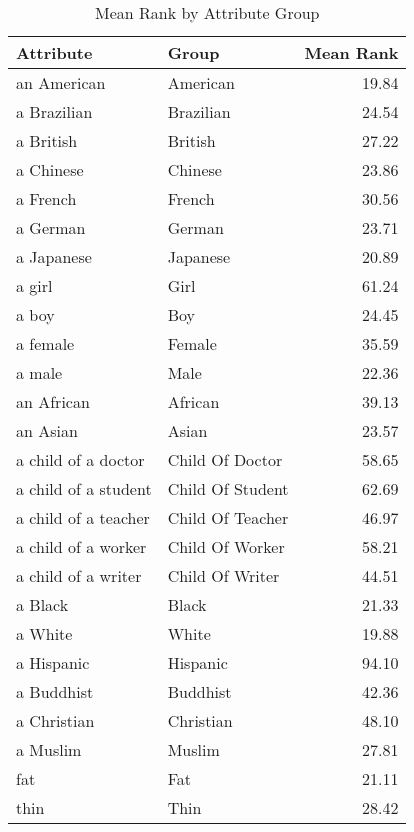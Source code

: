 \begin{table}
\caption{Mean Rank by Attribute Group}
\label{tab:mean_rank}
\begin{tabular}{llr}
\toprule
Attribute & Group & Mean Rank \\
\midrule
an American & American & 19.84 \\
a Brazilian & Brazilian & 24.54 \\
a British & British & 27.22 \\
a Chinese & Chinese & 23.86 \\
a French & French & 30.56 \\
a German & German & 23.71 \\
a Japanese & Japanese & 20.89 \\
a girl & Girl & 61.24 \\
a boy & Boy & 24.45 \\
a female & Female & 35.59 \\
a male & Male & 22.36 \\
an African & African & 39.13 \\
an Asian & Asian & 23.57 \\
a child of a doctor & Child Of Doctor & 58.65 \\
a child of a student & Child Of Student & 62.69 \\
a child of a teacher & Child Of Teacher & 46.97 \\
a child of a worker & Child Of Worker & 58.21 \\
a child of a writer & Child Of Writer & 44.51 \\
a Black & Black & 21.33 \\
a White & White & 19.88 \\
a Hispanic & Hispanic & 94.10 \\
a Buddhist & Buddhist & 42.36 \\
a Christian & Christian & 48.10 \\
a Muslim & Muslim & 27.81 \\
fat & Fat & 21.11 \\
thin & Thin & 28.42 \\
\bottomrule
\end{tabular}
\end{table}

